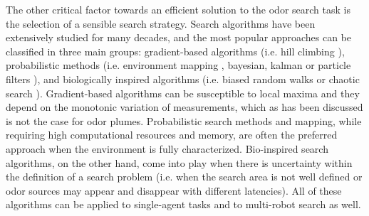 The other critical factor towards an efficient solution to the odor search task is the selection of a sensible search strategy. Search algorithms have been extensively studied for many decades, and the most popular approaches can be classified in three main groups: gradient-based algorithms (i.e. hill climbing \cite{Mcgill2011}), probabilistic methods (i.e. environment mapping \cite{FoxKo05}, bayesian, kalman or particle filters \cite{jatmiko2011robots}), and biologically inspired algorithms (i.e. biased random walks \cite{Hein24072012} or chaotic search \cite{KongcunM09}).
Gradient-based algorithms can be susceptible to local maxima and they depend on the monotonic variation of measurements, which as has been discussed is not the case for odor plumes. Probabilistic search methods and mapping, while requiring high computational resources and memory, are often the preferred approach when the environment is fully characterized.
Bio-inspired search algorithms, on the other hand, come into play when there is uncertainty within the definition of a search problem (i.e. when the search area is not well defined or odor sources may appear and disappear with different latencies).
All of these algorithms can be applied to single-agent tasks and to multi-robot search as well.








